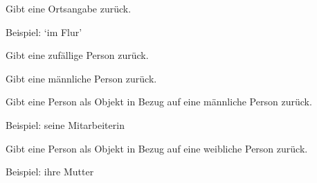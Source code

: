 \documentclass[a4paper,12pt,oneside]{sphinxmanual}
\begin{document}

\begin{fulllineitems}
\label{module:pyzufall.generator.ort}
Gibt eine Ortsangabe zurück.

Beispiel: `im Flur'

\end{fulllineitems}


\begin{fulllineitems}
\label{module:pyzufall.generator.person}
Gibt eine zufällige Person zurück.

\end{fulllineitems}


\begin{fulllineitems}
\label{module:pyzufall.generator.person_m}
Gibt eine männliche Person zurück.

\end{fulllineitems}


\begin{fulllineitems}
\label{module:pyzufall.generator.person_objekt_m}
Gibt eine Person als Objekt in Bezug auf eine männliche Person zurück.

Beispiel: seine Mitarbeiterin

\end{fulllineitems}


\begin{fulllineitems}
\label{module:pyzufall.generator.person_objekt_w}
Gibt eine Person als Objekt in Bezug auf eine weibliche Person zurück.

Beispiel: ihre Mutter

\end{fulllineitems}

\end{document}
